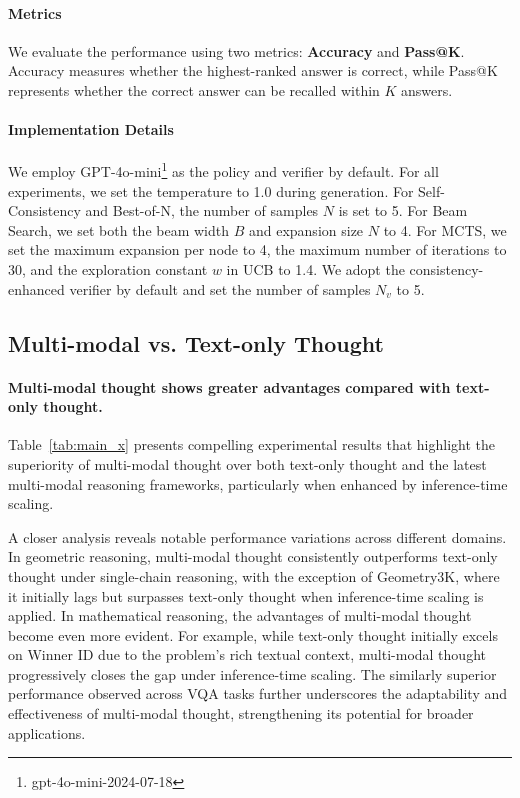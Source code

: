 \paragraph{Metrics} We evaluate the performance using two metrics: \textbf{Accuracy} and \textbf{Pass@K}.
Accuracy measures whether the highest-ranked answer is correct, while Pass@K represents whether the correct answer can be recalled within $K$ answers.

\paragraph{Implementation Details} 
We employ GPT-4o-mini\footnote{gpt-4o-mini-2024-07-18} as the policy and verifier by default.
For all experiments, we set the temperature to 1.0 during generation.
For Self-Consistency and Best-of-N, the number of samples $N$ is set to 5.
For Beam Search, we set both the beam width $B$ and expansion size $N$ to 4.
For MCTS, we set the maximum expansion per node to 4, the maximum number of iterations to 30, and the exploration constant $w$ in UCB to 1.4.
We adopt the consistency-enhanced verifier by default and set the number of samples $N_v$ to 5.




\subsection{Multi-modal vs. Text-only Thought}
\paragraph{Multi-modal thought shows greater advantages compared with text-only thought.}

Table~\ref{tab:main_x} presents compelling experimental results that highlight the superiority of multi-modal thought over both text-only thought and the latest multi-modal reasoning frameworks, particularly when enhanced by inference-time scaling.

A closer analysis reveals notable performance variations across different domains. In geometric reasoning, multi-modal thought consistently outperforms text-only thought under single-chain reasoning, with the exception of Geometry3K, where it initially lags but surpasses text-only thought when inference-time scaling is applied. In mathematical reasoning, the advantages of multi-modal thought become even more evident. For example, while text-only thought initially excels on Winner ID due to the problem’s rich textual context, multi-modal thought progressively closes the gap under inference-time scaling. The similarly superior performance observed across VQA tasks further underscores the adaptability and effectiveness of multi-modal thought, strengthening its potential for broader applications.



